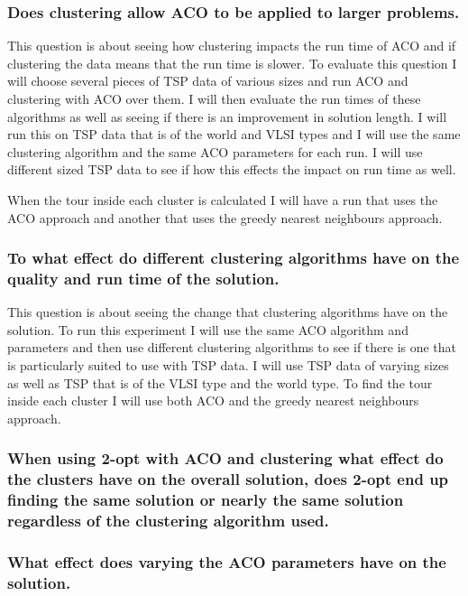 \subsubsection{Does clustering allow ACO to be applied to larger problems.}
This question is about seeing how clustering impacts the run time of ACO and if clustering the data means that the run time is slower. To evaluate this question I will choose several pieces of TSP data of various sizes and run ACO and clustering with ACO over them. I will then evaluate the run times of these algorithms as well as seeing if there is an improvement in solution length. I will run this on TSP data that is of the world and VLSI types and I will use the same clustering algorithm and the same ACO parameters for each run. I will use different sized TSP data to see if how this effects the impact on run time as well.

When the tour inside each cluster is calculated I will have a run that uses the ACO approach and another that uses the greedy nearest neighbours approach.


\subsubsection{To what effect do different clustering algorithms have on the quality and run time of the solution.}

This question is about seeing the change that clustering algorithms have on the solution. To run this experiment I will use the same ACO algorithm and parameters and then use different clustering algorithms to see if there is one that is particularly suited to use with TSP data. I will use TSP data of varying sizes as well as TSP that is of the VLSI type and the world type. To find the tour inside each cluster I will use both ACO and the greedy nearest neighbours approach. 


\subsubsection{When using 2-opt with ACO and clustering what effect do the clusters have on the overall solution, does 2-opt end up finding the same solution or nearly the same solution regardless of the clustering algorithm used.}

\subsubsection{What effect does varying the ACO parameters have on the solution.}

